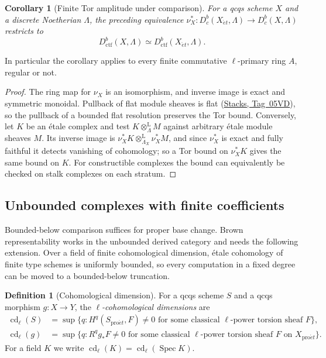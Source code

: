 \documentclass[11pt,a4paper]{article}
\numberwithin{equation}{section}
\newtheorem{corollary}[theorem]{Corollary}
\theoremstyle{definition}
\newtheorem{definition}[theorem]{Definition}
\theoremstyle{remark}
\newcommand{\Dbc}{D^b_c}
\newcommand{\et}{\acute{e}t}
\newcommand{\proet}{\mathrm{pro}\acute{e}t}
\newcommand{\stacks}[1]{\href{https://stacks.math.columbia.edu/tag/#1}{\textnormal{Stacks, Tag~#1}}}
\newcommand{\Dctf}{D^b_{\mathrm{ctf}}}
\begin{document}
\begin{corollary}[Finite Tor amplitude under comparison]
\label{pe:finite-tor-comparison}
For a qcqs scheme $X$ and a discrete Noetherian $\Lambda$, the preceding equivalence
$\nu_X^*\colon D^b_c(X_{\et},\Lambda)\to\Dbc(X,\Lambda)$ restricts to
\[
 \Dctf(X,\Lambda)\simeq
 D^b_{\mathrm{ctf}}(X_{\et},\Lambda).
\]
\end{corollary}
In particular the corollary applies to every finite commutative
$\ell$-primary ring $A$, regular or not.
\begin{proof}
The ring map for $\nu_X$ is an isomorphism, and inverse image is
exact and symmetric monoidal. Pullback of flat module sheaves is flat
(\stacks{05VD}), so the pullback of a bounded flat resolution
preserves the Tor bound. Conversely, let $K$ be an \'etale complex and
test $K\otimes_\Lambda^{\mathrm L}M$ against arbitrary \'etale module
sheaves $M$. Its inverse image is
$\nu_X^*K\otimes_{\Lambda_X}^{\mathrm L}\nu_X^*M$, and since $\nu_X^*$
is exact and fully faithful it detects vanishing of cohomology; so a
Tor bound on $\nu_X^*K$ gives the same bound on $K$. For constructible
complexes the bound can equivalently be checked on stalk complexes on
each stratum.
\end{proof}

\subsection{Unbounded complexes with finite coefficients}
\label{pe:unbounded-section}
Bounded-below comparison suffices for proper base change. Brown
representability works in the unbounded derived category and needs the
following extension. Over a field of finite cohomological dimension,
\'etale cohomology of finite type schemes is uniformly bounded, so
every computation in a fixed degree can be moved to a bounded-below
truncation.

\begin{definition}[Cohomological dimension]
\label{n:def-cd}
For a qcqs scheme $S$ and a qcqs morphism $g:X\to Y$, the
\emph{$\ell$-cohomological dimensions} are
\[
\begin{aligned}
 \operatorname{cd}_\ell(S)&=\sup\{q: H^q(S_{\proet},F)\neq0
     \text{ for some classical $\ell$-power torsion sheaf $F$}\},\\
 \operatorname{cd}_\ell(g)&=\sup\{q: R^qg_*F\neq0
     \text{ for some classical $\ell$-power torsion sheaf $F$ on }X_{\proet}\}.
\end{aligned}
\]
For a field $K$ we write $\operatorname{cd}_\ell(K)=\operatorname{cd}_\ell(\operatorname{Spec}K)$.
\end{definition}
\end{document}
